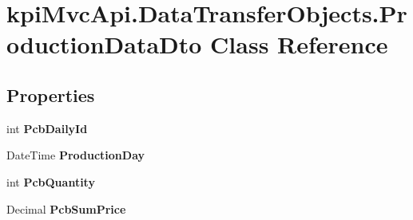 \hypertarget{classkpi_mvc_api_1_1_data_transfer_objects_1_1_production_data_dto}{}\section{kpi\+Mvc\+Api.\+Data\+Transfer\+Objects.\+Production\+Data\+Dto Class Reference}
\label{classkpi_mvc_api_1_1_data_transfer_objects_1_1_production_data_dto}
\subsection*{Properties}
\begin{DoxyCompactItemize}
\item 
\mbox{\label{classkpi_mvc_api_1_1_data_transfer_objects_1_1_production_data_dto_ada9471296e56fbddf87a940ed1b1b88f}} 
int {\bfseries Pcb\+Daily\+Id}
\item 
\mbox{\label{classkpi_mvc_api_1_1_data_transfer_objects_1_1_production_data_dto_a6f1dd3e3f210648edc70906573918192}} 
Date\+Time {\bfseries Production\+Day}
\item 
\mbox{\label{classkpi_mvc_api_1_1_data_transfer_objects_1_1_production_data_dto_a98ef947e84cd2aabd0b4240c086beb0d}} 
int {\bfseries Pcb\+Quantity}
\item 
\mbox{\label{classkpi_mvc_api_1_1_data_transfer_objects_1_1_production_data_dto_acca10b415d7547c262099a5898990eed}} 
Decimal {\bfseries Pcb\+Sum\+Price}
\item 
\mbox{\label{classkpi_mvc_api_1_1_data_transfer_objects_1_1_production_data_dto_a1e45eafe705eac11678b0893f5449732}} 

\end{DoxyCompactItemize}
